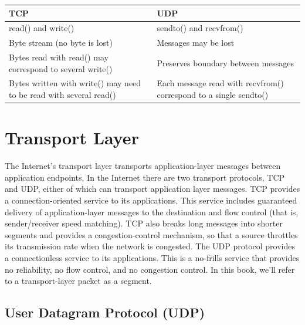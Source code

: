 \documentclass[12pt]{article}
\begin{document}
\begin{tabular}{ p{3in} | p{3in} }
    TCP & UDP \\\hline
    read() and write() & sendto() and recvfrom() \\\hline
    Byte stream (no byte is lost) & Messages may be lost \\\hline
    Bytes read with read() may correspond to several write() & Preserves boundary between messages \\\hline
    Bytes written with write() may need to be read with several read() & Each message read with recvfrom() correspond to a single sendto() \\
\end{tabular}

\newpage

\section{Transport Layer}

The Internet's transport layer transports application-layer messages between application endpoints. In the Internet there are two transport protocols, TCP and UDP, either of which can transport application layer messages. TCP provides a connection-oriented service to its applications. This service includes guaranteed delivery of application-layer messages to the destination and flow control (that is, sender/receiver speed matching). TCP also breaks long messages into shorter segments and provides a congestion-control mechanism, so that a source throttles its transmission rate when the network is congested. The UDP protocol provides a connectionless service to its applications. This is a no-frills service that provides no reliability, no flow control, and no congestion control. In this book, we'll refer to a transport-layer packet as a segment.

\subsection{User Datagram Protocol (UDP)}
\end{document}
